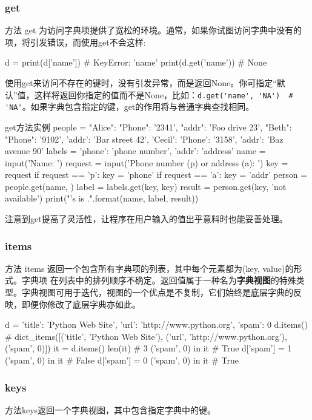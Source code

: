 \subsubsection{get}
方法 get 为访问字典项提供了宽松的环境。通常，如果你试图访问字典中没有的项，将引发错误，而使用get不会这样:
\begin{pyc}
d = {}
print(d['name'])  # KeyError: 'name'
print(d.get('name'))  # None
\end{pyc}

使用get来访问不存在的键时，没有引发异常，而是返回None。你可指定“默认”值，这样将返回你指定的值而不是None，比如：\verb|d.get('name', 'NA')  # 'NA'|。如果字典包含指定的键，get的作用将与普通字典查找相同。
\begin{py}{get方法实例}
people = {
    "Alice": {"Phone": '2341', "addr": 'Foo drive 23'},
    "Beth": {"Phone": '9102', 'addr': 'Bar street 42'},
    'Cecil': {'Phone': '3158', 'addr': 'Baz avenue 90'}
}
labels = {'phone': 'phone number', 'addr': 'address'}
name = input('Name: ')
request = input('Phone number (p) or address (a): ')
key = request
if request == 'p':
    key = 'phone'
if request == 'a':
    key = 'addr'
person = people.get(name, {})
label = labels.get(key, key)
result = person.get(key, 'not available')
print("{}'s {} is {}.".format(name, label, result))
\end{py}

注意到get提高了灵活性，让程序在用户输入的值出乎意料时也能妥善处理。
\subsubsection{items}
方法 items 返回一个包含所有字典项的列表，其中每个元素都为(key, value)的形式。字典项
在列表中的排列顺序不确定。返回值属于一种名为\textbf{字典视图}的特殊类型。字典视图可用于迭代，视图的一个优点是不复制，它们始终是底层字典的反映，即便你修改了底层字典亦如此。
\begin{pyc}
d = {'title': 'Python Web Site', 'url': 'http://www.python.org', 'spam': 0}
d.items()
# dict_items([('title', 'Python Web Site'), ('url', 'http://www.python.org'), ('spam', 0)])
it = d.items()
len(it)  # 3
('spam', 0) in it  # True
d['spam'] = 1
('spam', 0) in it  # False
d['spam'] = 0
('spam', 0) in it  # True
\end{pyc}

\subsubsection{keys}
方法keys返回一个字典视图，其中包含指定字典中的键。
